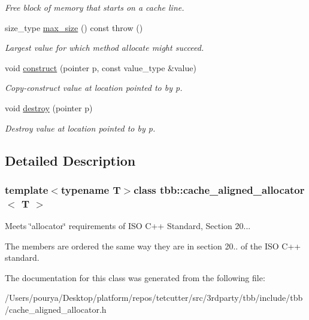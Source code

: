 \begin{DoxyCompactItemize}
\begin{DoxyCompactList}\small\item\em Free block of memory that starts on a cache line. \end{DoxyCompactList}\item 
\hypertarget{classtbb_1_1cache__aligned__allocator_a4b945b3180ea3dfe16dfa048f4591c6d}{}size\+\_\+type \hyperlink{classtbb_1_1cache__aligned__allocator_a4b945b3180ea3dfe16dfa048f4591c6d}{max\+\_\+size} () const   throw ()\label{classtbb_1_1cache__aligned__allocator_a4b945b3180ea3dfe16dfa048f4591c6d}

\begin{DoxyCompactList}\small\item\em Largest value for which method allocate might succeed. \end{DoxyCompactList}\item 
\hypertarget{classtbb_1_1cache__aligned__allocator_a5086d395a952eb13eb7d72bb0cb26937}{}void \hyperlink{classtbb_1_1cache__aligned__allocator_a5086d395a952eb13eb7d72bb0cb26937}{construct} (pointer p, const value\+\_\+type \&value)\label{classtbb_1_1cache__aligned__allocator_a5086d395a952eb13eb7d72bb0cb26937}

\begin{DoxyCompactList}\small\item\em Copy-\/construct value at location pointed to by p. \end{DoxyCompactList}\item 
\hypertarget{classtbb_1_1cache__aligned__allocator_af2fd054d055403d4ea669fd3af661cc8}{}void \hyperlink{classtbb_1_1cache__aligned__allocator_af2fd054d055403d4ea669fd3af661cc8}{destroy} (pointer p)\label{classtbb_1_1cache__aligned__allocator_af2fd054d055403d4ea669fd3af661cc8}

\begin{DoxyCompactList}\small\item\em Destroy value at location pointed to by p. \end{DoxyCompactList}\end{DoxyCompactItemize}


\subsection{Detailed Description}
\subsubsection*{template$<$typename T$>$class tbb\+::cache\+\_\+aligned\+\_\+allocator$<$ T $>$}

Meets \char`\"{}allocator\char`\"{} requirements of I\+S\+O C++ Standard, Section 20... 

The members are ordered the same way they are in section 20.. of the I\+S\+O C++ standard. 

The documentation for this class was generated from the following file\+:\begin{DoxyCompactItemize}
\item 
/\+Users/pourya/\+Desktop/platform/repos/tetcutter/src/3rdparty/tbb/include/tbb/cache\+\_\+aligned\+\_\+allocator.\+h\end{DoxyCompactItemize}
